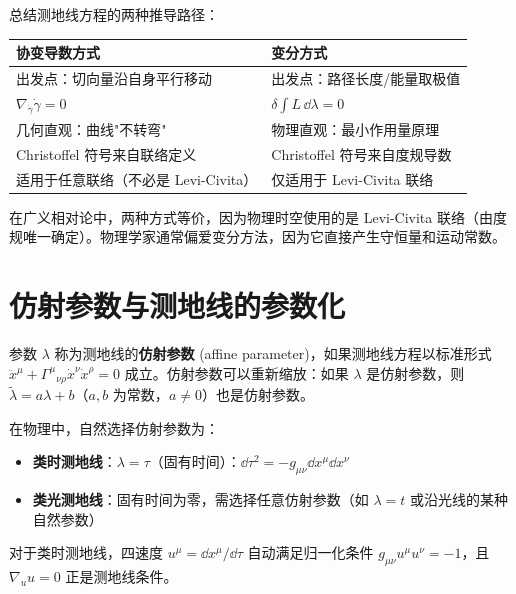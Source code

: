 \begin{note}[两种推导方式的对比]
总结测地线方程的两种推导路径：
\begin{center}
\begin{tabular}{p{}|p{}}
\hline
\textbf{协变导数方式} & \textbf{变分方式} \\
\hline
出发点：切向量沿自身平行移动 & 出发点：路径长度/能量取极值 \\
$\nabla_{\dot\gamma}\dot\gamma = 0$ & $\delta\!\int L\,\dd\lambda = 0$ \\
几何直观：曲线"不转弯" & 物理直观：最小作用量原理 \\
Christoffel 符号来自联络定义 & Christoffel 符号来自度规导数 \\
适用于任意联络（不必是 Levi-Civita） & 仅适用于 Levi-Civita 联络 \\
\hline
\end{tabular}
\end{center}
在广义相对论中，两种方式等价，因为物理时空使用的是 Levi-Civita 联络（由度规唯一确定）。物理学家通常偏爱变分方法，因为它直接产生守恒量和运动常数。
\end{note}

\section{仿射参数与测地线的参数化}

\begin{definition}[仿射参数]
参数 $\lambda$ 称为测地线的\textbf{仿射参数} (affine parameter)，如果测地线方程以标准形式 $\ddot x^\mu + \Gamma^\mu{}_{\nu\rho} \dot x^\nu \dot x^\rho = 0$ 成立。仿射参数可以重新缩放：如果 $\lambda$ 是仿射参数，则 $\tilde\lambda = a\lambda + b$（$a,b$ 为常数，$a \neq 0$）也是仿射参数。
\end{definition}

\begin{note}[物理参数化]
在物理中，自然选择仿射参数为：
\begin{itemize}
    \item \textbf{类时测地线}：$\lambda = \tau$（固有时间）：$\dd\tau^2 = -g_{\mu\nu} \dd x^\mu \dd x^\nu$
    \item \textbf{类光测地线}：固有时间为零，需选择任意仿射参数（如 $\lambda = t$ 或沿光线的某种自然参数）
\end{itemize}
对于类时测地线，四速度 $u^\mu = \dd x^\mu/\dd\tau$ 自动满足归一化条件 $g_{\mu\nu} u^\mu u^\nu = -1$，且 $\nabla_u u = 0$ 正是测地线条件。
\end{note}

